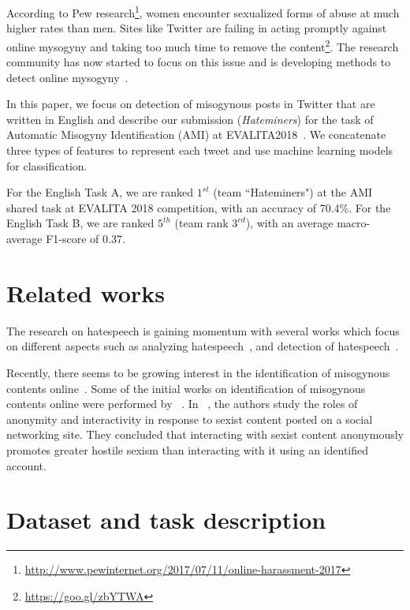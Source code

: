 \documentclass[11pt]{article}
\begin{document}
According to Pew research\footnote{\url{http://www.pewinternet.org/2017/07/11/online-harassment-2017}}, women encounter sexualized forms of abuse at much higher rates than men. Sites like Twitter are failing in acting promptly against online mysogyny and taking too much time to remove the content\footnote{\url{https://goo.gl/zbYTWA}}. The research community has now started to focus on this issue and is developing methods to detect online mysogyny~\cite{hewitt2016problem,fersini2018overview,poland2016haters}.


In this paper, we focus on detection of misogynous posts in Twitter that are written in English and describe our submission (\textit{Hateminers}) for the task of Automatic Misogyny Identification (AMI) at EVALITA2018~\cite{fersini2018overviewEvalita}. We concatenate three types of features to represent each tweet and use machine learning models for classification.

For the English Task  A,  we are ranked $1^{st}$ (team  ``Hateminers")  at  the  AMI shared task at EVALITA  2018 competition,  with  an  accuracy  of  70.4\%.  For  the English Task  B,  we are ranked $5^{th}$ (team rank $3^{rd}$), with an average macro-average F1-score of 0.37.




\section{Related works}

The research on hatespeech is gaining momentum with several works which focus on different aspects such as analyzing hatespeech~\cite{ElSherief2018PeerTP,mathew2018spread,silva2016analyzing,chandrasekharan2017you,grondahl2018all}, and detection of hatespeech~\cite{fortuna2018survey,davidson2017automated,qian2018hierarchical}. 

Recently, there seems to be growing interest in the identification of misogynous contents online~\cite{ging2018special}. Some of the initial works on identification of misogynous contents online were performed by ~\cite{Hewitt:2016:PIM:2908131.2908183}. 
In ~\cite{fox2015perpetuating}, the authors study the roles of anonymity and interactivity in response to sexist content posted on a social networking site. They concluded that interacting with sexist content anonymously promotes greater hostile sexism than interacting with it using an identified account.


\section{Dataset and task description}
\end{document}
